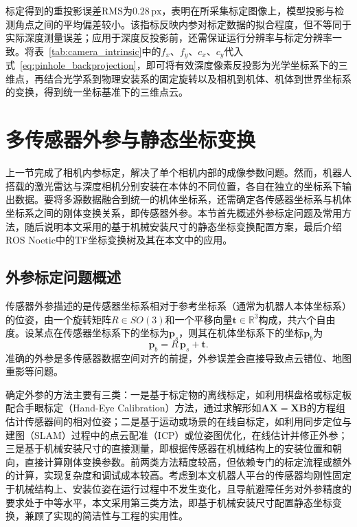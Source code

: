 标定得到的重投影误差RMS为$0.28\,\mathrm{px}$，表明在所采集标定图像上，模型投影与检测角点之间的平均偏差较小。该指标反映内参对标定数据的拟合程度，但不等同于实际深度测量误差；应用于深度反投影前，还需保证运行分辨率与标定分辨率一致。将表~\ref{tab:camera_intrinsic}中的$f_x$、$f_y$、$c_x$、$c_y$代入式~\eqref{eq:pinhole_backprojection}，即可将有效深度像素反投影为光学坐标系下的三维点，再结合光学系到物理安装系的固定旋转以及相机到机体、机体到世界坐标系的变换，得到统一坐标基准下的三维点云。

\section{多传感器外参与静态坐标变换}
\label{sec:extrinsic}
上一节完成了相机内参标定，解决了单个相机内部的成像参数问题。然而，机器人搭载的激光雷达与深度相机分别安装在本体的不同位置，各自在独立的坐标系下输出数据。要将多源数据融合到统一的机体坐标系，还需确定各传感器坐标系与机体坐标系之间的刚体变换关系，即传感器外参。本节首先概述外参标定问题及常用方法，随后说明本文采用的基于机械安装尺寸的静态坐标变换配置方案，最后介绍ROS Noetic中的TF坐标变换树及其在本文中的应用。

\subsection{外参标定问题概述}
传感器外参描述的是传感器坐标系相对于参考坐标系（通常为机器人本体坐标系）的位姿，由一个旋转矩阵$R\in SO(3)$和一个平移向量$\mathbf{t}\in\mathbb{R}^{3}$构成，共六个自由度。设某点在传感器坐标系下的坐标为$\mathbf{p}_s$，则其在机体坐标系下的坐标$\mathbf{p}_b$为
\begin{equation}
    \mathbf{p}_b = R\,\mathbf{p}_s + \mathbf{t}.
    \label{eq:extrinsic_transform}
\end{equation}
准确的外参是多传感器数据空间对齐的前提，外参误差会直接导致点云错位、地图重影等问题。

确定外参的方法主要有三类：一是基于标定物的离线标定，如利用棋盘格或标定板配合手眼标定（Hand-Eye Calibration）方法，通过求解形如$\mathbf{AX}=\mathbf{XB}$的方程组估计传感器间的相对位姿；二是基于运动或场景的在线自标定，如利用同步定位与建图（SLAM）过程中的点云配准（ICP）或位姿图优化，在线估计并修正外参；三是基于机械安装尺寸的直接测量，即根据传感器在机械结构上的安装位置和朝向，直接计算刚体变换参数。前两类方法精度较高，但依赖专门的标定流程或额外的计算，实现复杂度和调试成本较高。考虑到本文机器人平台的传感器均刚性固定于机械结构上、安装位姿在运行过程中不发生变化，且导航避障任务对外参精度的要求处于中等水平，本文采用第三类方法，即基于机械安装尺寸配置静态坐标变换，兼顾了实现的简洁性与工程的实用性。

